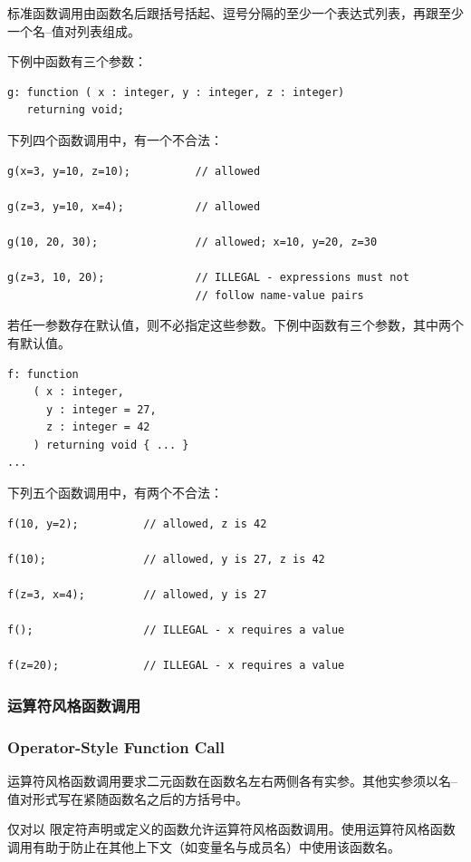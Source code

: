 标准函数调用由函数名后跟括号括起、逗号分隔的至少一个表达式列表，再跟至少一个名--值对列表组成。

下例中函数有三个参数：
\begin{lstlisting}[style=pxl]
g: function ( x : integer, y : integer, z : integer)
   returning void;
\end{lstlisting}

下列四个函数调用中，有一个不合法：
\begin{lstlisting}[style=pxl]
g(x=3, y=10, z=10);          // allowed

g(z=3, y=10, x=4);           // allowed

g(10, 20, 30);               // allowed; x=10, y=20, z=30

g(z=3, 10, 20);              // ILLEGAL - expressions must not
                             // follow name-value pairs
\end{lstlisting}

若任一参数存在默认值，则不必指定这些参数。下例中函数有三个参数，其中两个有默认值。
\begin{lstlisting}[style=pxl]
f: function
    ( x : integer,
      y : integer = 27,
      z : integer = 42
    ) returning void { ... }
...
\end{lstlisting}

下列五个函数调用中，有两个不合法：
\begin{lstlisting}[style=pxl]
f(10, y=2);          // allowed, z is 42

f(10);               // allowed, y is 27, z is 42

f(z=3, x=4);         // allowed, y is 27

f();                 // ILLEGAL - x requires a value

f(z=20);             // ILLEGAL - x requires a value
\end{lstlisting}

\subsubsection{运算符风格函数调用}
\subsubsection*{Operator-Style Function Call}

运算符风格函数调用要求二元函数在函数名左右两侧各有实参。其他实参须以名--值对形式写在紧随函数名之后的方括号中。

仅对以  限定符声明或定义的函数允许运算符风格函数调用。使用运算符风格函数调用有助于防止在其他上下文（如变量名与成员名）中使用该函数名。

